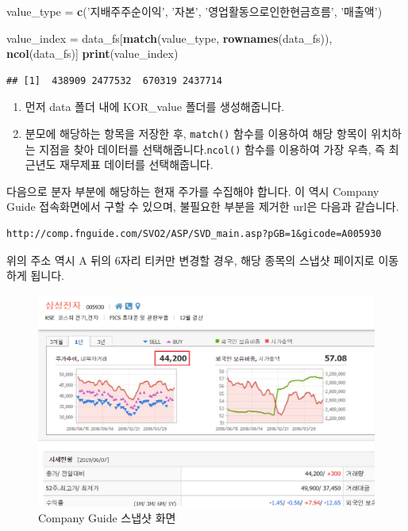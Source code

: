 \documentclass[]{book}
\newenvironment{Shaded}{\begin{snugshade}}{\end{snugshade}}
\newcommand{\KeywordTok}[1]{\textcolor[rgb]{0.13,0.29,0.53}{\textbf{#1}}}
\newcommand{\NormalTok}[1]{#1}
\newcommand{\StringTok}[1]{\textcolor[rgb]{0.31,0.60,0.02}{#1}}
\providecommand{\tightlist}{%
  \setlength{\itemsep}{0pt}\setlength{\parskip}{0pt}}
\begin{document}
\begin{Shaded}
\begin{Highlighting}[]
\NormalTok{value_type =}\StringTok{ }\KeywordTok{c}\NormalTok{(}\StringTok{'지배주주순이익'}\NormalTok{,}
               \StringTok{'자본'}\NormalTok{,}
               \StringTok{'영업활동으로인한현금흐름'}\NormalTok{,}
               \StringTok{'매출액'}\NormalTok{)}

\NormalTok{value_index =}\StringTok{ }\NormalTok{data_fs[}\KeywordTok{match}\NormalTok{(value_type, }\KeywordTok{rownames}\NormalTok{(data_fs)),}
                      \KeywordTok{ncol}\NormalTok{(data_fs)]}
\KeywordTok{print}\NormalTok{(value_index)}
\end{Highlighting}
\end{Shaded}

\begin{verbatim}
## [1]  438909 2477532  670319 2437714
\end{verbatim}

\begin{enumerate}
\def\labelenumi{\arabic{enumi}.}
\tightlist
\item
  먼저 data 폴더 내에 KOR\_value 폴더를 생성해줍니다.
\item
  분모에 해당하는 항목을 저장한 후, \texttt{match()} 함수를 이용하여 해당 항목이 위치하는 지점을 찾아 데이터를 선택해줍니다.\texttt{ncol()} 함수를 이용하여 가장 우측, 즉 최근년도 재무제표 데이터를 선택해줍니다.
\end{enumerate}

다음으로 분자 부분에 해당하는 현재 주가를 수집해야 합니다. 이 역시 Company Guide 접속화면에서 구할 수 있으며, 불필요한 부분을 제거한 url은 다음과 같습니다.

\begin{verbatim}
http://comp.fnguide.com/SVO2/ASP/SVD_main.asp?pGB=1&gicode=A005930
\end{verbatim}

위의 주소 역시 A 뒤의 6자리 티커만 변경할 경우, 해당 종목의 스냅샷 페이지로 이동하게 됩니다.

\begin{figure}

{\centering \includegraphics{images/crawl_practice_comp_price} 

}

\caption{Company Guide 스냅샷 화면}\label{fig:unnamed-chunk-20}
\end{figure}
\end{document}
